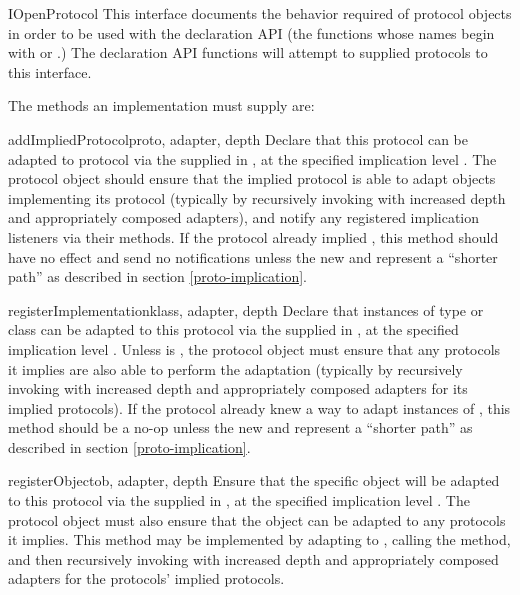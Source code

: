 \begin{verbatim%
}
\begin{verbatim%
}
\begin{verbatim%
}
\begin{verbatim%
}
\begin{verbatim%
}
\begin{verbatim%
}
\begin{classdesc*}{IOpenProtocol}
This interface documents the behavior required of protocol objects in order to
be used with the  declaration API (the functions whose names
begin with  or .)  The declaration API functions
will attempt to  supplied protocols to this interface.

The methods an  implementation must supply are:

\begin{methoddesc}{addImpliedProtocol}{proto, adapter, depth}
Declare that this protocol can be adapted to protocol  via the
 supplied in , at the specified implication
level .  The protocol object should ensure that the implied protocol
is able to adapt objects implementing its protocol (typically by recursively
invoking  with increased depth and
appropriately composed adapters), and notify any registered implication
listeners via their  methods.  If the protocol
already implied , this method should have no effect and send no
notifications unless the new  and  represent a
``shorter path'' as described in section \ref{proto-implication}.
\end{methoddesc}

\begin{methoddesc}{registerImplementation}{klass, adapter, depth}
Declare that instances of type or class  can be adapted to this
protocol via the  supplied in , at the
specified implication level .  Unless  is
, the protocol object must ensure that
any protocols it implies are also able to perform the adaptation (typically
by recursively invoking  with increased depth
and appropriately composed adapters for its implied protocols).  If the
protocol already knew a way to adapt instances of , this method
should be a no-op unless the new  and  represent a
``shorter path'' as described in section \ref{proto-implication}.
\end{methoddesc}

\begin{methoddesc}{registerObject}{ob, adapter, depth}
Ensure that the specific object  will be adapted to this protocol via
the  supplied in , at the specified
implication level .  The protocol object must also ensure that the
object can be adapted to any protocols it implies.  This method may be
implemented by adapting  to , calling the
 method, and then recursively invoking
 with increased depth and appropriately
composed adapters for the protocols' implied protocols.
\end{methoddesc}


\end{classdesc*}
\end{verbatim%
}
\end{verbatim%
}
\end{verbatim%
}
\end{verbatim%
}
\end{verbatim%
}
\end{verbatim%
}
